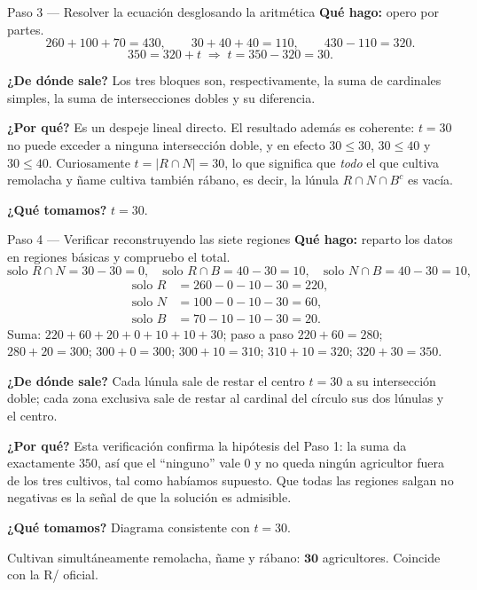 \documentclass[11pt]{article}
\begin{document}
\begin{paso}{Paso 3 --- Resolver la ecuación desglosando la aritmética}
\textbf{Qué hago:} opero por partes.
\[
260+100+70 = 430,\qquad 30+40+40 = 110,\qquad 430-110 = 320 .
\]
\[
350 = 320 + t \;\Longrightarrow\; t = 350-320 = 30 .
\]

\textbf{¿De dónde sale?} Los tres bloques son, respectivamente, la suma de cardinales simples, la suma de
intersecciones dobles y su diferencia.

\textbf{¿Por qué?} Es un despeje lineal directo. El resultado además es coherente: $t=30$ no puede exceder
a ninguna intersección doble, y en efecto $30\le 30$, $30\le 40$ y $30\le 40$. Curiosamente $t=|R\cap N|=30$,
lo que significa que \emph{todo} el que cultiva remolacha y ñame cultiva también rábano, es decir, la lúnula
$R\cap N\cap B^{c}$ es vacía.

\textbf{¿Qué tomamos?} $t=30$.
\end{paso}

\begin{paso}{Paso 4 --- Verificar reconstruyendo las siete regiones}
\textbf{Qué hago:} reparto los datos en regiones básicas y compruebo el total.
\[
\text{solo }R\cap N = 30-30 = 0,\quad \text{solo }R\cap B = 40-30 = 10,\quad \text{solo }N\cap B = 40-30 = 10,
\]
\[
\begin{aligned}
\text{solo }R &= 260 - 0 - 10 - 30 = 220,\\
\text{solo }N &= 100 - 0 - 10 - 30 = 60,\\
\text{solo }B &= 70 - 10 - 10 - 30 = 20 .
\end{aligned}
\]
Suma: $220+60+20+0+10+10+30$; paso a paso $220+60=280$; $280+20=300$; $300+0=300$; $300+10=310$;
$310+10=320$; $320+30=350$.

\textbf{¿De dónde sale?} Cada lúnula sale de restar el centro $t=30$ a su intersección doble; cada zona
exclusiva sale de restar al cardinal del círculo sus dos lúnulas y el centro.

\textbf{¿Por qué?} Esta verificación confirma la hipótesis del Paso 1: la suma da exactamente $350$, así
que el ``ninguno'' vale $0$ y no queda ningún agricultor fuera de los tres cultivos, tal como habíamos
supuesto. Que todas las regiones salgan no negativas es la señal de que la solución es admisible.

\textbf{¿Qué tomamos?} Diagrama consistente con $t=30$.
\end{paso}

\begin{resp}
Cultivan simultáneamente remolacha, ñame y rábano: $\mathbf{30}$ agricultores. Coincide con la R/ oficial.
\end{resp}
\end{document}
